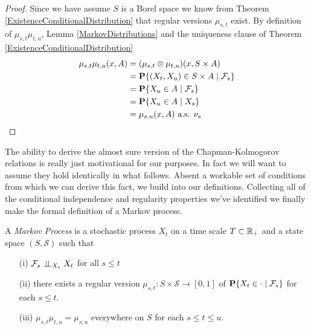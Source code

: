 \begin{proof}
Since we have assume $S$ is a Borel space we know from Theorem \ref{ExistenceConditionalDistribution} that regular
versions $\mu_{s,t}$ exist.  By definition of $\mu_{s,t} \mu_{t,u}$, Lemma
\ref{MarkovDistributions} and the uniqueness clause of Theorem \ref{ExistenceConditionalDistribution}
\begin{align*}
\mu_{s,t} \mu_{t,u}(x, A) &= 
(\mu_{s,t} \otimes \mu_{t,u})(x, S \times A) \\
&= \cprobability{\mathcal{F}_s}{(X_t, X_u) \in S \times A} \\
&=\cprobability{\mathcal{F}_s}{ X_u \in A} \\
&=\cprobability{X_s}{ X_u \in A} \\
&= \mu_{s,u}(x, A) \text{  a.s. $\nu_s$}
\end{align*}
\end{proof}

The ability to derive the almost sure version of the
Chapman-Kolmogorov relations is really just motivational for our
purposes.  In fact we will want to assume they hold identically in
what follows.  Absent a workable set of conditions from which we can
derive this fact, we build into our definitions.  Collecting all of
the conditional independence and regularity properties we've
identified we finally make the formal definition of a Markov process.
\begin{defn}
A \emph{Markov Process} is a stochastic process $X_t$ on a time scale $T
\subset \reals_+$ and a state space $(S, \mathcal{S})$ such that 
\begin{itemize}
\item[(i)]$\cindependent{\mathcal{F}_s}{X_t}{X_s}$ for all $s \leq t$
\item[(ii)]there exists a regular version $\mu_{s,t} :
  S \times \mathcal{S} \to [0,1]$ of $\cprobability{\mathcal{F}_s}{X_t
    \in \cdot}$ for each $s \leq t$.
\item[(iii)]$\mu_{s,t} \mu_{t,u} = \mu_{s,u}$ everywhere on $S$ for
  each $s \leq t \leq u$.
\end{itemize}
\end{defn}

